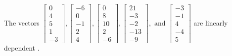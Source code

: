 \begin{exercise}
\begin{exerciseStatement}
  \end{exerciseStatement}
  \begin{exerciseAnswer}
   The vectors \(\left[\begin{array}{r}
0 \\
4 \\
5 \\
1 \\
-3
\end{array}\right] , \left[\begin{array}{r}
-6 \\
0 \\
-1 \\
2 \\
4
\end{array}\right] , \left[\begin{array}{r}
0 \\
8 \\
10 \\
2 \\
-6
\end{array}\right] , \left[\begin{array}{r}
21 \\
-3 \\
-2 \\
-13 \\
-9
\end{array}\right] , \text{ and } \left[\begin{array}{r}
-3 \\
-1 \\
4 \\
-4 \\
5
\end{array}\right]\) are 
  	 linearly dependent  .
  


  \end{exerciseAnswer}
\end{exercise}
